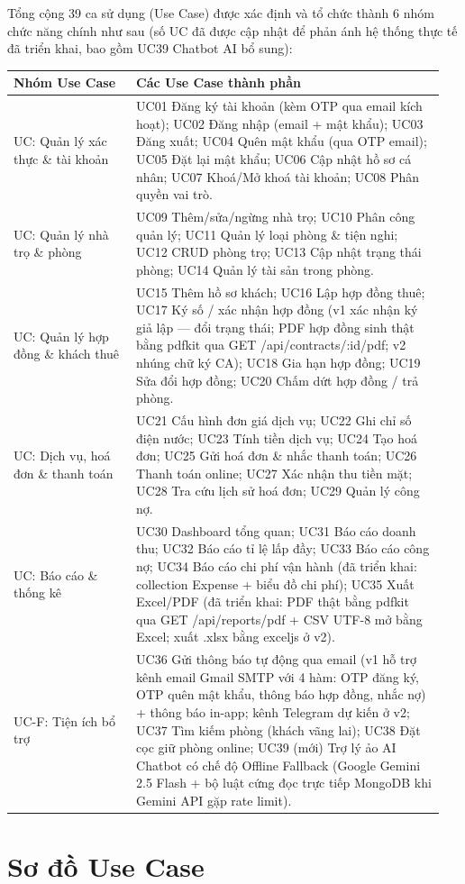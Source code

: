 Tổng cộng 39 ca sử dụng (Use Case) được xác định và tổ chức thành 6 nhóm
chức năng chính như sau (số UC đã được cập nhật để phản ánh hệ thống
thực tế đã triển khai, bao gồm UC39 Chatbot AI bổ sung):

\begin{longtable}[]{@{}>{\RaggedRight\arraybackslash}p{0.27\linewidth}>{\RaggedRight\arraybackslash}p{0.68\linewidth}@{}}
\toprule
\textbf{Nhóm Use Case} & \textbf{Các Use Case thành phần}\tabularnewline
\midrule
\endhead
UC: Quản lý xác thực \& tài khoản & UC01 Đăng ký tài khoản (kèm OTP qua
email kích hoạt); UC02 Đăng nhập (email + mật khẩu); UC03 Đăng xuất;
UC04 Quên mật khẩu (qua OTP email); UC05 Đặt lại mật khẩu; UC06 Cập nhật
hồ sơ cá nhân; UC07 Khoá/Mở khoá tài khoản; UC08 Phân quyền vai
trò.\tabularnewline
UC: Quản lý nhà trọ \& phòng & UC09 Thêm/sửa/ngừng nhà trọ; UC10 Phân
công quản lý; UC11 Quản lý loại phòng \& tiện nghi; UC12 CRUD phòng trọ;
UC13 Cập nhật trạng thái phòng; UC14 Quản lý tài sản trong
phòng.\tabularnewline
UC: Quản lý hợp đồng \& khách thuê & UC15 Thêm hồ sơ khách; UC16 Lập hợp
đồng thuê; UC17 Ký số / xác nhận hợp đồng (v1 xác nhận ký giả lập ---
đổi trạng thái; PDF hợp đồng sinh thật bằng pdfkit qua GET
/api/contracts/:id/pdf; v2 nhúng chữ ký CA); UC18 Gia hạn hợp đồng; UC19
Sửa đổi hợp đồng; UC20 Chấm dứt hợp đồng / trả phòng.\tabularnewline
UC: Dịch vụ, hoá đơn \& thanh toán & UC21 Cấu hình đơn giá dịch vụ; UC22
Ghi chỉ số điện nước; UC23 Tính tiền dịch vụ; UC24 Tạo hoá đơn; UC25 Gửi
hoá đơn \& nhắc thanh toán; UC26 Thanh toán online; UC27 Xác nhận thu
tiền mặt; UC28 Tra cứu lịch sử hoá đơn; UC29 Quản lý công
nợ.\tabularnewline
UC: Báo cáo \& thống kê & UC30 Dashboard tổng quan; UC31 Báo cáo doanh
thu; UC32 Báo cáo tỉ lệ lấp đầy; UC33 Báo cáo công nợ; UC34 Báo cáo chi
phí vận hành (đã triển khai: collection Expense + biểu đồ chi phí); UC35
Xuất Excel/PDF (đã triển khai: PDF thật bằng pdfkit qua GET
/api/reports/pdf + CSV UTF-8 mở bằng Excel; xuất .xlsx bằng exceljs ở
v2).\tabularnewline
UC-F: Tiện ích bổ trợ & UC36 Gửi thông báo tự động qua email (v1 hỗ trợ
kênh email Gmail SMTP với 4 hàm: OTP đăng ký, OTP quên mật khẩu, thông
báo hợp đồng, nhắc nợ) + thông báo in-app; kênh Telegram dự kiến ở v2;
UC37 Tìm kiếm phòng (khách vãng lai); UC38 Đặt cọc giữ phòng online;
UC39 (mới) Trợ lý ảo AI Chatbot có chế độ Offline Fallback (Google
Gemini 2.5 Flash + bộ luật cứng đọc trực tiếp MongoDB khi Gemini API gặp
rate limit).\tabularnewline
\bottomrule
\end{longtable}

\section{Sơ đồ Use Case}

